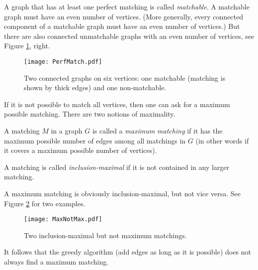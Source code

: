 \begin{page}


A graph that has at least one perfect matching is called \emph{matchable}.
A matchable graph must have an even number of vertices.
(More generally, every connected component of a matchable graph must have an even number of vertices.)
But there are also connected unmatchable graphs with an even number of vertices, see Figure \ref{fig:PerfMatch}, right.

\begin{figure}[ht]
\begin{center}
\texttt{[image: PerfMatch.pdf]}
\end{center}
\caption{Two connected graphs on six vertices: one matchable (matching is shown by thick edges) and one non-matchable.}
\label{fig:PerfMatch}
\end{figure}

If it is not possible to match all vertices, then one can ask for a maximum possible matching.
There are two notions of maximality.

\end{page}

\begin{page}

\begin{dfn}
A matching $M$ in a graph $G$ is called a \emph{maximum matching} if it has the maximum possible number of edges among all matchings in $G$
(in other words if it covers a maximum possible number of vertices).

A matching is called \emph{inclusion-maximal} if it is not contained in any larger matching.
\end{dfn}

\end{page}

\begin{page}


A maximum matching is obviously inclusion-maximal, but not vice versa.
See Figure \ref{fig:MaxNotMax} for two examples.

\begin{figure}[ht]
\begin{center}
\texttt{[image: MaxNotMax.pdf]}
\end{center}
\caption{Two inclusion-maximal but not maximum matchings.}
\label{fig:MaxNotMax}
\end{figure}

It follows that the greedy algorithm (add edges as long as it is possible) does not always find a maximum matching.




\end{page}

